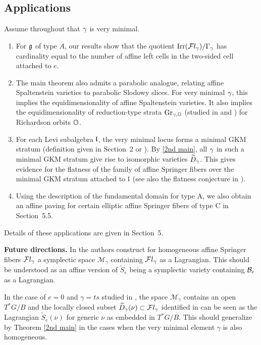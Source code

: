 \documentclass[11pt]{article}
\numberwithin{equation}{section}
\begin{document}
\subsection{Applications}
Assume throughout that $\gamma$ is very minimal.
\begin{enumerate}
    \item  For $\mathfrak{g}$ of type $A$, our results show that the quotient $\operatorname{Irr}(\mathcal{F}l_\gamma)/\Gamma_\gamma$ has
cardinality equal to the number of affine left cells in the two-sided cell
attached to $e$.

    \item The main theorem also admits a parabolic analogue, relating affine
    Spaltenstein varieties to parabolic Slodowy slices. For very minimal $\gamma$, this implies the equidimensionality of affine
    Spaltenstein varieties. It also implies the equidimensionality of
    reduction-type strata $\operatorname{Gr}_{\gamma,\mathbb{O}}$ (studied in \cite{Yun2021} and
    \cite{Yunfiltration}) for Richardson orbits $\mathbb{O}$.

    \item For each Levi subalgebra $\mathfrak{l}$, the very minimal locus forms a
    minimal GKM stratum (definition given in Section~2 or
    \cite{FKV}). By \cref{2nd main}, all $\gamma$ in such a minimal GKM stratum
    give rise to isomorphic varieties $\widetilde{D}_\gamma$. This gives evidence
    for the flatness of the family of affine Springer fibers over the minimal GKM
    stratum attached to $\mathfrak{l}$ (see also the flatness conjecture in \cite[Section 6]{FKV}).
    \item Using the description of the fundamental domain for type A, we also obtain an affine paving for certain elliptic affine Springer fibers of type C in Section~5.5.
\end{enumerate}
Details of these applications are given in Section~5. 

\noindent\textbf{Future directions.}
In \cite{BBAMY} the authors construct for homogeneous affine Springer fibers $\mathcal{F}l_\gamma$ a symplectic space $\mathcal{M}_\gamma$ containing $\mathcal{F}l_\gamma$ as a Lagrangian. This should be understood as an affine version of $\widetilde{S}_e$ being a symplectic variety containing $\mathcal{B}_e$ as a Lagrangian.

In the case of $e=0$ and $\gamma=ts$ studied in \cite{remarkASF}, the space $\mathcal{M}_\gamma$ contains an open $T^*G/B$ and the locally closed subset $\widetilde{D}_\gamma(\nu)\subset\mathcal{F}l_\gamma$ identified in \cite{remarkASF} can be seen as the Lagrangian $\widetilde{S}_e(\nu)$ for generic $\nu$ as embedded in $T^*G/B$. This should generalize by Theorem \ref{2nd main} in the cases when the very minimal element $\gamma$ is also homogeneous.
\end{document}
